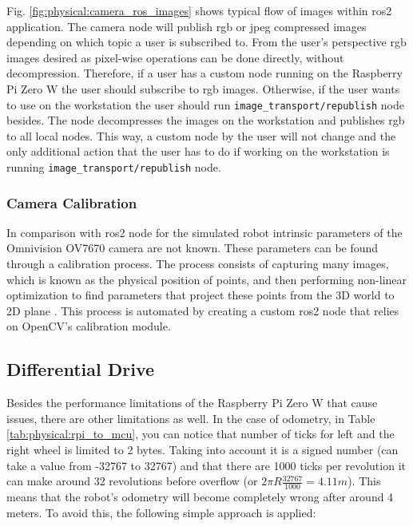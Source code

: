 Fig. \ref{fig:physical:camera_ros_images} shows typical flow of images within \ac{ros2} application.
The camera node will publish \acs{rgb} or \acs{jpeg} compressed images depending on which topic a user is subscribed to.
From the user's perspective \ac{rgb} images desired as pixel-wise operations can be done directly, without decompression.
Therefore, if a user has a custom node running on the Raspberry Pi Zero W the user should subscribe to \ac{rgb} images.
Otherwise, if the user wants to use on the workstation the user should run \texttt{image\_transport/republish} node besides.
The node decompresses the images on the workstation and publishes \ac{rgb} to all local nodes.
This way, a custom node by the user will not change and the only additional action that the user has to do if working on the workstation is running \texttt{image\_transport/republish} node.
 
\subsubsection{Camera Calibration}
In comparison with \ac{ros2} node for the simulated robot intrinsic parameters of the Omnivision OV7670 camera are not known.
These parameters can be found through a calibration process. The process consists of capturing many images, which is known as the physical position of points, and then performing non-linear optimization to find parameters that project these points from the 3D world to 2D plane \cite{lukic_dual_nodate}. This process is automated by creating a custom \ac{ros2} node that relies on OpenCV's calibration module.

\subsection{Differential Drive}
Besides the performance limitations of the Raspberry Pi Zero W that cause issues, there are other limitations as well. In the case of odometry, in Table \ref{tab:physical:rpi_to_mcu}, you can notice that number of ticks for left and the right wheel is limited to 2 bytes. Taking into account it is a signed number (can take a value from -32767 to 32767) and that there are 1000 ticks per revolution it can make around 32 revolutions before overflow (or $ 2 \pi R \frac{32767}{1000} = 4.11m $). This means that the robot's odometry will become completely wrong after around 4 meters. To avoid this, the following simple approach is applied:


